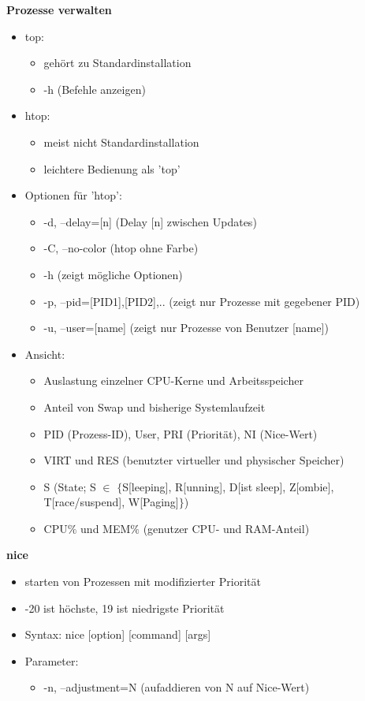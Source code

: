 \documentclass[12pt,utf8, 10pt]{article}
\begin{document}
\textbf{Prozesse verwalten}
\begin{itemize}
	\item top:
	\begin{itemize}
		\item gehört zu Standardinstallation
		\item -h (Befehle anzeigen)
	\end{itemize}
	\item htop:
	\begin{itemize}
		\item meist nicht Standardinstallation
		\item leichtere Bedienung als 'top'
	\end{itemize}
	\item Optionen für 'htop':
	\begin{itemize}
		\item -d, --delay=[n] (Delay [n] zwischen Updates)
		\item -C, --no-color (htop ohne Farbe)
		\item -h (zeigt mögliche Optionen)
		\item -p, --pid=[PID1],[PID2],.. (zeigt nur Prozesse mit gegebener PID)
		\item -u, --user=[name] (zeigt nur Prozesse von Benutzer [name])
	\end{itemize}
	\item Ansicht:
	\begin{itemize}
		\item Auslastung einzelner CPU-Kerne und Arbeitsspeicher
		\item Anteil von Swap und bisherige Systemlaufzeit
		\item PID (Prozess-ID), User, PRI (Priorität), NI (Nice-Wert)
		\item VIRT und RES (benutzter virtueller und physischer Speicher)
		\item S (State; S $\in$ $\{$S[leeping], R[unning], D[ist sleep], Z[ombie], T[race/suspend], W[Paging]$\}$)
		\item CPU$\%$ und MEM$\%$ (genutzer CPU- und RAM-Anteil)
	\end{itemize}
\end{itemize}

\textbf{nice}
\begin{itemize}
	\item starten von Prozessen mit modifizierter Priorität
	\item -20 ist höchste, 19 ist niedrigste Priorität
	\item Syntax: nice [option] [command] [args]
	\item Parameter:
	\begin{itemize}
		\item -n, --adjustment=N (aufaddieren von N auf Nice-Wert)
	\end{itemize}
\end{itemize}
\end{document}
